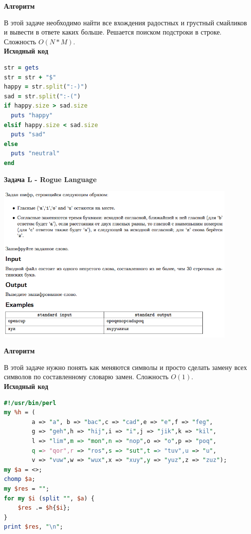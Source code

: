\documentclass[a4paper,12pt]{article}
\begin{document}
\textbf{{\large Алгоритм}}

В этой задаче необходимо найти все вхождения радостных и грустный смайликов и вывести в ответе каких больше. Решается поиском подстроки в строке. Сложность $O(N * M)$. \\

\textbf{{\large Исходный код}} \\
\begin{lstlisting}[language=Ruby]
str = gets
str = str + "$"
happy = str.split(":-)")
sad = str.split(":-(")
if happy.size > sad.size
  puts "happy"
elsif happy.size < sad.size
  puts "sad"
else
  puts "neutral"
end
\end{lstlisting}


\newpage
\textbf{{\large Задача L - Rogue Language}} \\

\begin{center}
\includegraphics[width=0.9\textwidth]{OC_Japan/L.png}\\ [1cm]
\end{center}

\textbf{{\large Алгоритм}}

В этой задаче нужно понять как меняются символы и просто сделать замену всех символов по составленному словарю замен. Сложность $O(1)$. \\

\textbf{{\large Исходный код}} \\
\begin{lstlisting}[language=Perl]
#!/usr/bin/perl
my %h = (
		a => "a", b => "bac",c => "cad",e => "e",f => "feg",
		g => "geh",h => "hij",i => "i",j => "jik",k => "kil",
		l => "lim",m => "mon",n => "nop",o => "o",p => "poq",
		q => "qor",r => "ros",s => "sut",t => "tuv",u => "u",
		v => "vuw",w => "wux",x => "xuy",y => "yuz",z => "zuz");
my $a = <>;
chomp $a;
my $res = "";
for my $i (split "", $a) {
	$res .= $h{$i};
}
print $res, "\n";
\end{lstlisting}
\end{document}
